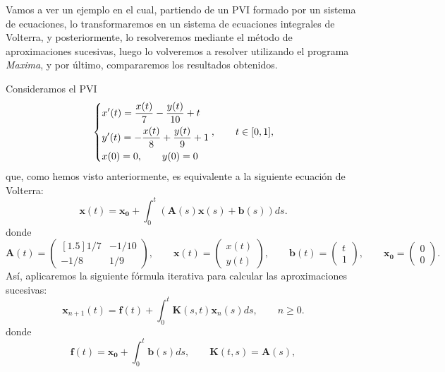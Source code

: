 Vamos a ver un ejemplo en el cual, partiendo de un PVI formado por un sistema de ecuaciones, lo transformaremos en un sistema de ecuaciones integrales de Volterra, y posteriormente, lo resolveremos mediante el método de aproximaciones sucesivas, luego lo volveremos a resolver utilizando el programa \textit{Maxima}, y por último, compararemos los resultados obtenidos.

\begin{ejemplo}
	Consideramos el PVI
	\begin{equation}
		\begin{dcases} x'(t) = \dfrac{x(t)}{7}-\dfrac{y(t)}{10} + t \\ y'(t) = -\dfrac{x(t)}{8} +\dfrac{y(t)}{9} +1 \\ x(0) = 0, \qquad y(0) = 0 \end{dcases}, \qquad t \in [0,1],
	\end{equation}
	que, como hemos visto anteriormente, es equivalente a la siguiente ecuación de Volterra:
	\begin{equation}
		\textbf{x}(t)= \textbf{x}_\textbf{0} + \int_0^t (\textbf{A}(s)\textbf{x}(s)+\textbf{b}(s))ds.
	\end{equation}
	donde
	\begin{equation}
		\textbf{A}(t) = \begin{pmatrix}[1.5]
			1/7 & -1/10 \\ 
			-1/8 & 1/9
		\end{pmatrix}, \qquad \textbf{x}(t) = \begin{pmatrix}
			x(t) \\ y(t)
		\end{pmatrix}, \qquad \textbf{b}(t) = \begin{pmatrix}
			t \\ 1
		\end{pmatrix}, \qquad \textbf{x}_\textbf{0} = \begin{pmatrix}
		0 \\ 0
		\end{pmatrix}.
	\end{equation}
	Así, aplicaremos la siguiente fórmula iterativa para calcular las aproximaciones sucesivas:
	\begin{equation}
		\textbf{x}_{n+1}(t) = \textbf{f}(t) + \int_0^t \textbf{K}(s,t)\textbf{x}_n(s)ds, \qquad n \geqslant 0.
	\end{equation}
	donde
	\begin{equation}
		\textbf{f}(t) = \textbf{x}_\textbf{0} + \int_0^t \textbf{b}(s)ds, \qquad \textbf{K}(t,s) = \textbf{A}(s),

\end{equation}
\end{ejemplo}
